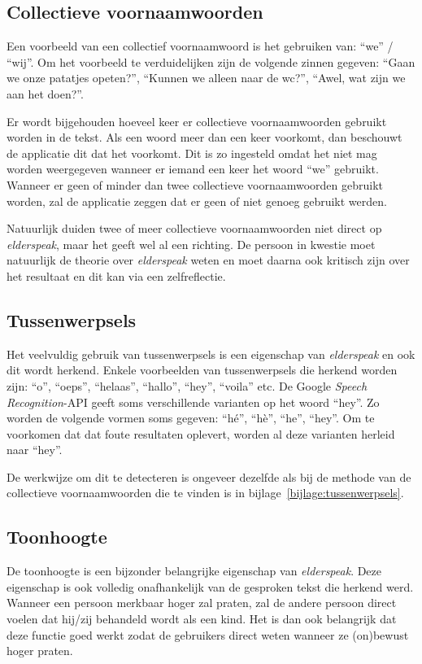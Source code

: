 \subsection{Collectieve voornaamwoorden}
Een voorbeeld van een collectief voornaamwoord is het gebruiken van: ``we'' / ``wij''. Om het voorbeeld te verduidelijken zijn de volgende zinnen gegeven: ``Gaan we onze patatjes opeten?'', ``Kunnen we alleen naar de wc?'', ``Awel, wat zijn we aan het doen?''.

Er wordt bijgehouden hoeveel keer er collectieve voornaamwoorden gebruikt worden in de tekst. Als een woord meer dan een keer voorkomt, dan beschouwt de applicatie dit dat het voorkomt. Dit is zo ingesteld omdat het niet mag worden weergegeven wanneer er iemand een keer het woord ``we'' gebruikt.
Wanneer er geen of minder dan twee collectieve voornaamwoorden gebruikt worden, zal de applicatie zeggen dat er geen of niet genoeg gebruikt werden.

Natuurlijk duiden twee of meer collectieve voornaamwoorden niet direct op \textit{elderspeak}, maar het geeft wel al een richting. De persoon in kwestie moet natuurlijk de theorie over \textit{elderspeak} weten en moet daarna ook kritisch zijn over het resultaat en dit kan via een zelfreflectie.

\subsection{Tussenwerpsels}
Het veelvuldig gebruik van tussenwerpsels is een eigenschap van \textit{elderspeak} en ook dit wordt herkend. Enkele voorbeelden van tussenwerpsels die herkend worden zijn: ``o'', ``oeps'', ``helaas'', ``hallo'', ``hey'', ``voila'' etc. De Google \textit{Speech Recognition}-API geeft soms verschillende varianten op het woord ``hey''. Zo worden de volgende vormen soms gegeven: ``hé'', ``hè'', ``he'', ``hey''. Om te voorkomen dat dat foute resultaten oplevert, worden al deze varianten herleid naar ``hey''.

De werkwijze om dit te detecteren is ongeveer dezelfde als bij de methode van de collectieve voornaamwoorden die te vinden is in bijlage~\ref{bijlage:tussenwerpsels}.

\subsection{Toonhoogte}
De toonhoogte is een bijzonder belangrijke eigenschap van \textit{elderspeak}. Deze eigenschap is ook volledig onafhankelijk van de gesproken tekst die herkend werd. Wanneer een persoon merkbaar hoger zal praten, zal de andere persoon direct voelen dat hij/zij behandeld wordt als een kind. Het is dan ook belangrijk dat deze functie goed werkt zodat de gebruikers direct weten wanneer ze (on)bewust hoger praten.

